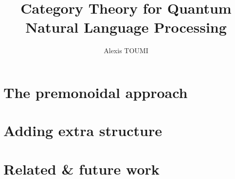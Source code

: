 

\title{Category Theory for Quantum\\
Natural Language Processing}
\author{Alexis TOUMI}

\degreedate{\today}




%
%
%
%
%
% 
% 
% 
% 
%
%
% 
% 
% 


\section{The premonoidal approach} \label{section:premonoidal}

\section{Adding extra structure} \label{section:extra structure}

\section{Related \& future work} \label{section:related and future}

